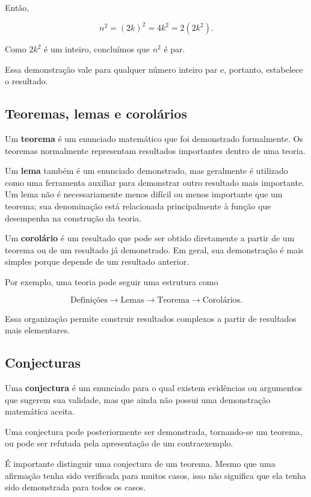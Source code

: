 \documentclass[
  brazilian,
  letterpaper,
]{book}
\theoremstyle{plain}
\theoremstyle{definition}
\theoremstyle{remark}
\begin{document}
Então,

\[
n^2=(2k)^2=4k^2=2(2k^2).
\]

Como \(2k^2\) é um inteiro, concluímos que \(n^2\) é par.

Essa demonstração vale para qualquer número inteiro par e, portanto,
estabelece o resultado.

\subsection{Teoremas, lemas e
corolários}\label{teoremas-lemas-e-coroluxe1rios}

Um \textbf{teorema} é um enunciado matemático que foi demonstrado
formalmente. Os teoremas normalmente representam resultados importantes
dentro de uma teoria.

Um \textbf{lema} também é um enunciado demonstrado, mas geralmente é
utilizado como uma ferramenta auxiliar para demonstrar outro resultado
mais importante. Um lema não é necessariamente menos difícil ou menos
importante que um teorema; sua denominação está relacionada
principalmente à função que desempenha na construção da teoria.

Um \textbf{corolário} é um resultado que pode ser obtido diretamente a
partir de um teorema ou de um resultado já demonstrado. Em geral, sua
demonstração é mais simples porque depende de um resultado anterior.

Por exemplo, uma teoria pode seguir uma estrutura como

\[
\text{Definições}
\rightarrow
\text{Lemas}
\rightarrow
\text{Teorema}
\rightarrow
\text{Corolários}.
\]

Essa organização permite construir resultados complexos a partir de
resultados mais elementares.

\subsection{Conjecturas}\label{conjecturas}

Uma \textbf{conjectura} é um enunciado para o qual existem evidências ou
argumentos que sugerem sua validade, mas que ainda não possui uma
demonstração matemática aceita.

Uma conjectura pode posteriormente ser demonstrada, tornando-se um
teorema, ou pode ser refutada pela apresentação de um contraexemplo.

É importante distinguir uma conjectura de um teorema. Mesmo que uma
afirmação tenha sido verificada para muitos casos, isso não significa
que ela tenha sido demonstrada para todos os casos.
\end{document}

